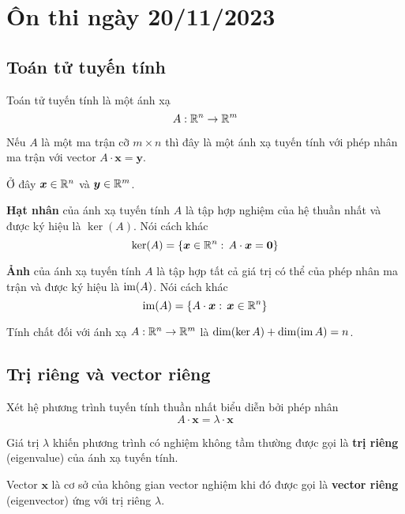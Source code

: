 \section{Ôn thi ngày 20/11/2023}

\subsection{Toán tử tuyến tính}

Toán tử tuyến tính là một ánh xạ \[ A: \mathbb{R}^n \to \mathbb{R}^m \]

Nếu $A$ là một ma trận cỡ $m \times n$ thì đây là một ánh xạ tuyến tính với phép nhân ma trận với vector $A \cdot \bm{x} = \bm{y}$.

Ở đây $\bm{x} \in \mathbb{R}^n$ và $\bm{y} \in \mathbb{R}^m$.

\begin{definition}
    \textbf{Hạt nhân} của ánh xạ tuyến tính $A$ là tập hợp nghiệm của hệ thuần nhất và được ký hiệu là $\ker(A)$. Nói cách khác
    \begin{equation}
        \ker(A) = \{ \bm{x} \in \mathbb{R}^n: \, A \cdot \bm{x} = \bm{0} \}
    \end{equation}
\end{definition}

\begin{definition}[Ảnh]
    \textbf{Ảnh} của ánh xạ tuyến tính $A$ là tập hợp tất cả giá trị có thể của phép nhân ma trận và được ký hiệu là $\operatorname{im}(A)$. Nói cách khác
    \begin{equation}
        \operatorname{im}(A) = \{ A \cdot \bm{x}: \, \bm{x} \in \mathbb{R}^n \}
    \end{equation}
\end{definition}

Tính chất đối với ánh xạ $A: \mathbb{R}^n \to \mathbb{R}^m$ là $\dim(\ker A) + \dim(\operatorname{im} A) = n$.

\subsection{Trị riêng và vector riêng}

\begin{definition}
    Xét hệ phương trình tuyến tính thuần nhất biểu diễn bởi phép nhân \[ A \cdot \bm{x} = \lambda \cdot \bm{x} \]

    Giá trị $\lambda$ khiến phương trình có nghiệm không tầm thường được gọi là \textbf{trị riêng} (eigenvalue) của ánh xạ tuyến tính.

    Vector $\bm{x}$ là cơ sở của không gian vector nghiệm khi đó được gọi là \textbf{vector riêng} (eigenvector) ứng với trị riêng $\lambda$.
\end{definition}

